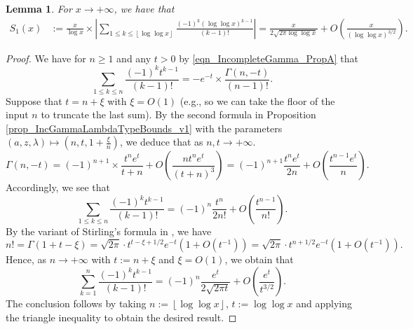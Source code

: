 \documentclass[11pt,reqno,a4letter]{article}
\numberwithin{figure}{section}
\numberwithin{table}{section}
\newcommand{\cf}{\textit{cf.\ }}
\newcommand{\floor}[1]{\left\lfloor #1 \right\rfloor}
\theoremstyle{plain}
\newtheorem{lemma}[theorem]{Lemma}
\numberwithin{theorem}{section}
\theoremstyle{definition}
\begin{document}
\begin{lemma}
\label{lemma_ConvenientIncGammaFuncTypePartialSumAsymptotics_v2}
For $x \rightarrow +\infty$, we have that 
\begin{align*}
S_1(x) & := \frac{x}{\log x} \times \left\lvert \sum_{1 \leq k \leq \floor{\log\log x}} 
     \frac{(-1)^k (\log\log x)^{k-1}}{(k-1)!} \right\rvert 
     = \frac{x}{2\sqrt{2\pi \log\log x}} + O\left(\frac{x}{(\log\log x)^{3/2}}\right). 
\end{align*}
\end{lemma}
\begin{proof}
We have for $n \geq 1$ and any $t > 0$ by 
\eqref{eqn_IncompleteGamma_PropA} that 
\[
\sum_{1 \leq k \leq n} \frac{(-1)^k t^{k-1}}{(k-1)!} = -e^{-t} \times 
     \frac{\Gamma(n, -t)}{(n-1)!}. 
\]
Suppose that $t = n + \xi$ with $\xi = O(1)$ (e.g., so we can take the floor of the input $n$ to 
truncate the last sum). By the second formula 
in Proposition \ref{prop_IncGammaLambdaTypeBounds_v1} 
with the parameters $(a, z, \lambda) \mapsto \left(n, t, 1 + \frac{\xi}{n}\right)$, 
we deduce that as $n,t \rightarrow +\infty$. 
\begin{equation}
\label{eqn_ProofTag_lemma_ConvenientIncGammaFuncTypePartialSumAsymptotics_v2}
\Gamma(n, -t) = (-1)^{n+1} \times \frac{t^n e^{t}}{t+n} + 
     O\left(\frac{n t^n e^{t}}{(t+n)^3}\right) = 
     (-1)^{n+1} \frac{t^n e^t}{2n} + O\left(\frac{t^{n-1} e^t}{n}\right). 
\end{equation}
Accordingly, we see that 
\[
\sum_{1 \leq k \leq n} \frac{(-1)^k t^{k-1}}{(k-1)!} = 
     (-1)^{n} \frac{t^n}{2n!} + O\left(\frac{t^{n-1}}{n!}\right). 
\]
By the variant of Stirling's formula in \cite[\cf Eq.\ (5.11.8)]{NISTHB}, we have 
\[
n! = \Gamma(1 + t - \xi) = \sqrt{2\pi} \cdot t^{t-\xi+1/2} e^{-t} \left(1 + O(t^{-1})\right) = 
     \sqrt{2\pi} \cdot t^{n+1/2} e^{-t} \left(1 + O(t^{-1})\right). 
\]
Hence, as $n \rightarrow +\infty$ with $t := n + \xi$ and $\xi = O(1)$, we obtain that 
\[
\sum_{k=1}^{n} \frac{(-1)^k t^{k-1}}{(k-1)!} = (-1)^n \frac{e^t}{2 \sqrt{2\pi t}} + 
     O\left(\frac{e^t}{t^{3/2}}\right). 
\]
The conclusion follows by taking $n := \floor{\log\log x}$, 
$t := \log\log x$ and applying the triangle inequality 
to obtain the desired result. 
\end{proof}
\end{document}
